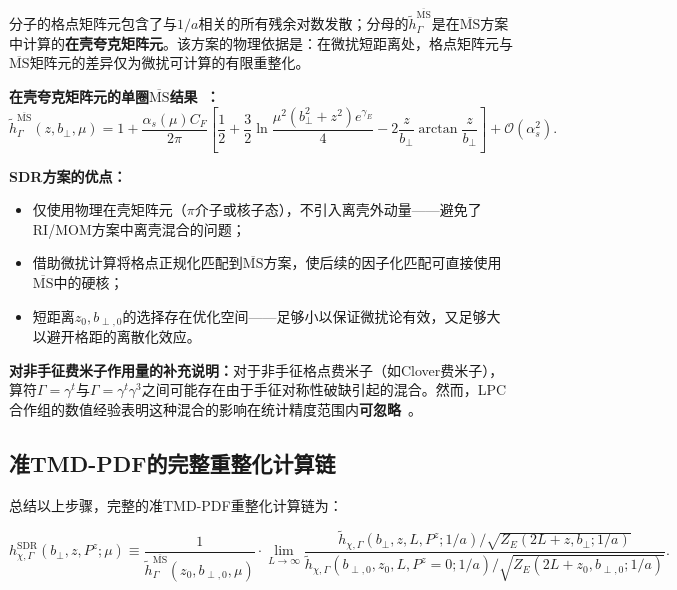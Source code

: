 \documentclass[12pt,a4paper]{ctexart}
\theoremstyle{definition}
\begin{document}
分子的格点矩阵元包含了与$1/a$相关的所有残余对数发散；分母的$\tilde{h}^{\overline{\text{MS}}}_\Gamma$是在$\overline{\text{MS}}$方案中计算的\textbf{在壳夸克矩阵元}。该方案的物理依据是：在微扰短距离处，格点矩阵元与$\overline{\text{MS}}$矩阵元的差异仅为微扰可计算的有限重整化。

\textbf{在壳夸克矩阵元的单圈$\overline{\text{MS}}$结果~\cite{Zhang2022renormTMD}：}
\begin{equation}
\tilde{h}^{\overline{\text{MS}}}_\Gamma(z, b_\perp, \mu) = 1 + \frac{\alpha_s(\mu) C_F}{2\pi}\left[ \frac{1}{2} + \frac{3}{2}\ln\frac{\mu^2(b_\perp^2 + z^2) e^{\gamma_E}}{4} - 2\frac{z}{b_\perp}\arctan\frac{z}{b_\perp} \right] + \mathcal{O}(\alpha_s^2).
\label{eq:MS_matrix}
\end{equation}

\textbf{SDR方案的优点：}
\begin{itemize}
    \item 仅使用物理在壳矩阵元（$\pi$介子或核子态），不引入离壳外动量——避免了RI/MOM方案中离壳混合的问题；
    \item 借助微扰计算将格点正规化匹配到$\overline{\text{MS}}$方案，使后续的因子化匹配可直接使用$\overline{\text{MS}}$中的硬核；
    \item 短距离$z_0, b_{\perp,0}$的选择存在优化空间——足够小以保证微扰论有效，又足够大以避开格距的离散化效应。
\end{itemize}

\textbf{对非手征费米子作用量的补充说明：}对于非手征格点费米子（如Clover费米子），算符$\Gamma = \gamma^t$与$\Gamma = \gamma^t\gamma^3$之间可能存在由于手征对称性破缺引起的混合。然而，LPC合作组的数值经验表明这种混合的影响在统计精度范围内\textbf{可忽略}~\cite{Zhang2022renormTMD}。

\subsection{准TMD-PDF的完整重整化计算链}

总结以上步骤，完整的准TMD-PDF重整化计算链为：

\begin{equation}
\boxed{h^{\text{SDR}}_{\chi,\Gamma}(b_\perp, z, P^z; \mu) \equiv \frac{1}{\tilde{h}^{\overline{\text{MS}}}_\Gamma(z_0, b_{\perp,0}, \mu)} \cdot \lim_{L\to\infty} \frac{\tilde{h}_{\chi,\Gamma}(b_\perp, z, L, P^z; 1/a) / \sqrt{Z_E(2L+z, b_\perp; 1/a)}}{\tilde{h}_{\chi,\Gamma}(b_{\perp,0}, z_0, L, P^z=0; 1/a) / \sqrt{Z_E(2L+z_0, b_{\perp,0}; 1/a)}}}.
\label{eq:full_renorm_chain}
\end{equation}
\end{document}
